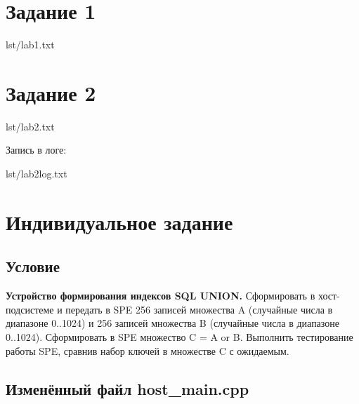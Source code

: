 \documentclass[a4paper,oneside,14pt]{extarticle}
\begin{document}

\setcounter{page}{2}
\renewcommand{\contentsname}{СОДЕРЖАНИЕ}
\tableofcontents

\newpage

\section{Задание 1}

\begin{lstinputlisting}[
        label={lst:1},
        caption={}
    ]{lst/lab1.txt}
\end{lstinputlisting}

\section{Задание 2}

\begin{lstinputlisting}[
        label={lst:1},
        caption={}
    ]{lst/lab2.txt}
\end{lstinputlisting}

Запись в логе:

\begin{lstinputlisting}[
        label={lst:1},
        caption={}
    ]{lst/lab2log.txt}
\end{lstinputlisting}

\newpage

\section{Индивидуальное задание}

\subsection{Условие}
\textbf{Устройство формирования индексов SQL UNION.}
Сформировать в хост-подсистеме и передать в SPE 256 записей множества A (случайные числа в диапазоне 0..1024) и 256 записей множества B (случайные числа в диапазоне 0..1024).
Сформировать в SPE множество C = A or B.
Выполнить тестирование работы SPE, сравнив набор ключей в множестве C с ожидаемым.

\subsection{Изменённый файл host\_main.cpp}
\end{document}
